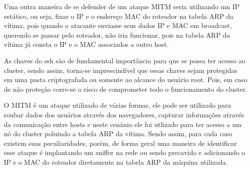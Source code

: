 Uma outra maneira de se defender de um ataque MITM seria utilizando um IP estático, ou seja, fixar o IP e o endereço MAC do roteador na tabela ARP da vítima, pois quando o atacante enviasse seus dados IP e MAC em broadcast, querendo se passar pelo roteador, não iria funcionar, pois na tabela ARP da vítima já consta o IP e o MAC associados a outro host.

As chaves do ssh são de fundamental importância para que se possa ter acesso ao cluster, sendo assim, torna-se imprescindível que essas chaves sejam protegidas em uma pasta criptografada ou somente ao alcance do usuário root. Pois, em caso de não proteção corre-se o risco de comprometer todo o funcionamento do cluster.

O MITM é um ataque utilizado de várias formas, ele pode ser utilizado para roubar dados dos usuários através dos navegadores, capturar informações através da comunicação entre hosts e neste cenánio ele foi utlizado para ter acesso a um nó do cluster poluindo a tabela ARP da vítima. Sendo assim, para cada caso existem suas peculiaridades, porém, de forma geral uma maneira de identificar esse ataque é implantando um sniffer na rede ou sendo precavido e adicionando o IP e o MAC do roteador diretamente na tabela ARP da máquina utilizada.


